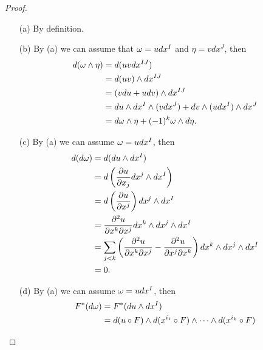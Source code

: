 \begin{proof}
\begin{enumerate}
    \item[(a)] By definition. 
    \item[(b)] By (a) we can assume that $\omega = udx^I$ and $\eta = vdx^J$, then 
    \begin{align*}
    d(\omega \wedge \eta) &= d(uv dx^{IJ}) \\
    &= d(uv) \wedge dx^{IJ} \\
    &= (vdu + udv) \wedge dx^{IJ} \\
    &= du \wedge dx^I \wedge (v dx^J) + dv \wedge (u dx^I) \wedge dx^J \\
    &= d\omega \wedge \eta + (-1)^k \omega \wedge d\eta.
    \end{align*}
    \item[(c)] By (a) we can assume $\omega = udx^I$, then 
    \begin{align*}
    d(d\omega) &= d(du \wedge dx^I) \\
    &= d \left(\pdv{u}{x_j} dx^j \wedge dx^I \right) \\
    &= d \left(\pdv{u}{x^j}\right) dx^j \wedge dx^I \\
    &= \pdv[2]{u}{x^k}{x^j} dx^k \wedge dx^j \wedge dx^I \\
    &= \sum_{j < k} \left(
    \pdv[2]{u}{x^k}{x^j} - \pdv[2]{u}{x^j}{x^k} 
    \right) dx^k \wedge dx^j \wedge dx^I \\
    &= 0.
    \end{align*}
    \item[(d)] By (a) we can assume $\omega = u dx^I$, then 
    \begin{align*}
    F^*(d\omega) &= F^*(du \wedge dx^I) \\
    &= d(u \circ F) \wedge d(x^{i_1} \circ F) \wedge \cdots \wedge d(x^{i_k} \circ F) 
    \end{align*}
\end{enumerate}
\end{proof}
